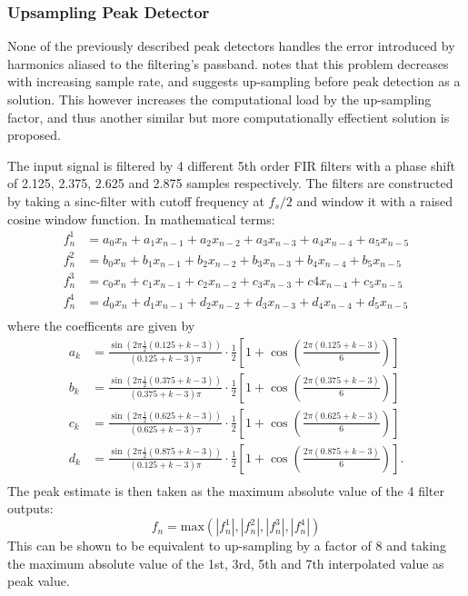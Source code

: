 \documentclass[../main2.tex]{subfiles}
\begin{document}
\subsubsection{Upsampling Peak Detector}
None of the previously described peak detectors handles the error introduced by harmonics aliased to the filtering's passband. \cite{frindle1996implementation} notes that this problem decreases with increasing sample rate, and suggests up-sampling before peak detection as a solution. This however increases the computational load by the up-sampling factor, and thus another similar but more computationally effectient solution is proposed.

The input signal is filtered by 4 different 5th order FIR filters with a phase shift of 2.125, 2.375, 2.625 and 2.875 samples respectively. The filters are constructed by taking a sinc-filter with cutoff frequency at $f_s/2$ and window it with a raised cosine window function. In mathematical terms:
\begin{equation}
\begin{split}
f^1_n &= a_0 x_{n} + a_1 x_{n-1} + a_2 x_{n-2} + a_3 x_{n-3} + a_4 x_{n-4} + a_5 x_{n-5} \\
f^2_n &= b_0 x_{n} + b_1 x_{n-1} + b_2 x_{n-2} + b_3 x_{n-3} + b_4 x_{n-4} + b_5 x_{n-5} \\
f^3_n &= c_0 x_{n} + c_1 x_{n-1} + c_2 x_{n-2} + c_3 x_{n-3} + c4 x_{n-4} + c_5 x_{n-5} \\
f^4_n &= d_0 x_{n} + d_1 x_{n-1} + d_2 x_{n-2} + d_3 x_{n-3} + d_4 x_{n-4} + d_5 x_{n-5} \\
\end{split}
\end{equation}
where the coefficents are given by
\begin{equation}
\begin{split}
a_k &= \frac{\sin (2 \pi \frac{1}{2} (0.125+k-3) )}{(0.125+k-3)\pi} \cdot \frac{1}{2}\left[1+\cos \left(\frac{2 \pi (0.125+k-3)}{6} \right) \right] \\
b_k &= \frac{\sin (2 \pi \frac{1}{2} (0.375+k-3) )}{(0.375+k-3)\pi} \cdot \frac{1}{2}\left[1+\cos \left(\frac{2 \pi (0.375+k-3)}{6} \right) \right] \\
c_k &= \frac{\sin (2 \pi \frac{1}{2} (0.625+k-3) )}{(0.625+k-3)\pi} \cdot \frac{1}{2}\left[1+\cos \left(\frac{2 \pi (0.625+k-3)}{6} \right) \right] \\
d_k &= \frac{\sin (2 \pi \frac{1}{2} (0.875+k-3) )}{(0.125+k-3)\pi} \cdot \frac{1}{2}\left[1+\cos \left(\frac{2 \pi (0.875+k-3)}{6} \right) \right]. \\
\end{split}
\end{equation}
The peak estimate is then taken as the maximum absolute value of the 4 filter outputs:
\begin{equation}
f_n = \text{max}(|f^1_n|, |f^2_n|, |f^3_n|, |f^4_n|)
\end{equation}
This can be shown to be equivalent to up-sampling by a factor of 8 and taking the maximum absolute value of the 1st, 3rd, 5th and 7th interpolated value as peak value. 
\end{document}
